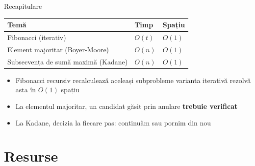 ﻿\documentclass{beamer}
\begin{document}
\begin{frame}{Recapitulare}
  \begin{center}
  \begin{tabular}{lll}
    \toprule
    Temă & Timp & Spațiu \\
    \midrule
    Fibonacci (iterativ)              & $O(t)$ & $O(1)$ \\
    Element majoritar (Boyer-Moore)   & $O(n)$ & $O(1)$ \\
    Subsecvența de sumă maximă (Kadane) & $O(n)$ & $O(1)$ \\
    \bottomrule
  \end{tabular}
  \end{center}

  \smallskip
  \begin{itemize}
    \item Fibonacci recursiv recalculează aceleași subprobleme \textemdash{} varianta iterativă rezolvă asta în $O(1)$ spațiu
    \item La elementul majoritar, un candidat găsit prin anulare \textbf{trebuie verificat}
    \item La Kadane, decizia la fiecare pas: continuăm sau pornim din nou
  \end{itemize}
\end{frame}

\section{Resurse}
\end{document}
